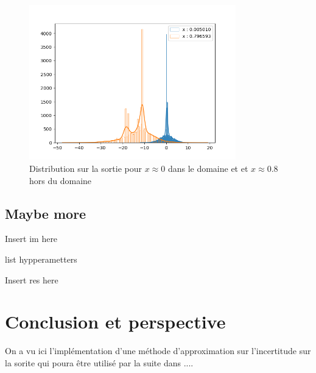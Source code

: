 \documentclass[french,12pt]{article}
\begin{document}
\begin{figure}[H]
    \centering
    \includegraphics[width = 0.8\textwidth]{../plots/plotIncertitudeSortieSin2-12-04-2023_10-48-11--249&329.png}
    \caption{Distribution sur la sortie pour $x \approx 0$ dans le domaine et et $x \approx 0.8$ hors du domaine}
\end{figure}

\subsection{Maybe more}

Insert im here

list hypperametters

Insert res here


\pagebreak
\section{Conclusion et perspective}
On a vu ici l'implémentation d'une méthode d'approximation sur l'incertitude
sur la sorite qui poura être utilisé par la suite dans ....

\pagebreak


\end{document}
